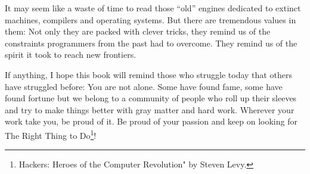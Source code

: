 \documentclass[book.tex]{subfiles}
\begin{document}
\bigskip

It may seem like a waste of time to read those ``old'' engines dedicated to extinct machines, compilers and operating systems. But there are tremendous values in them: Not only they are packed with clever tricks, they remind us of the constraints programmers from the past had to overcome. They remind us of the spirit it took to reach new frontiers.\\ 
\par
If anything, I hope this book will remind those who struggle today that others have struggled before: You are not alone. Some have found fame, some have found fortune but we belong to a community of people who roll up their sleeves and try to make things better with gray matter and hard work. Wherever your work take you, be proud of it. Be proud of your passion and keep on looking for The Right Thing to Do\footnote{Hackers: Heroes of the Computer Revolution" by Steven Levy.}!\\



\end{document}
